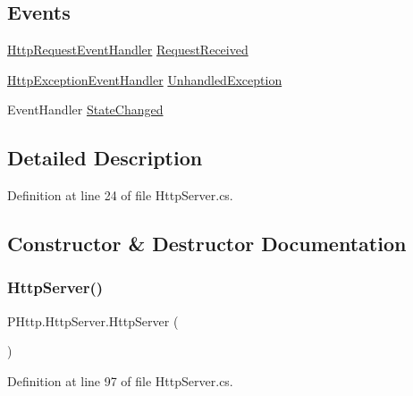 \subsection*{Events}
\begin{DoxyCompactItemize}
\item 
\hyperlink{namespace_p_http_a746b16e27637dd7ea95bb9256e7a93ff}{Http\+Request\+Event\+Handler} \hyperlink{class_p_http_1_1_http_server_ad29016597c3dd5c2aa944afce3c7dd13}{Request\+Received}
\item 
\hyperlink{namespace_p_http_a3004f4a8bbd5aaf98c00d1771384224f}{Http\+Exception\+Event\+Handler} \hyperlink{class_p_http_1_1_http_server_a08a7e838dc1d9c70ffa94ffce48a4533}{Unhandled\+Exception}
\item 
Event\+Handler \hyperlink{class_p_http_1_1_http_server_a2a33f616b3d6fc6df79ec3c23f562a4b}{State\+Changed}
\end{DoxyCompactItemize}


\subsection{Detailed Description}


Definition at line 24 of file Http\+Server.\+cs.



\subsection{Constructor \& Destructor Documentation}
\mbox{\label{class_p_http_1_1_http_server_a6eda60a2a05fb5850dec16bbc620fb99}} 
\subsubsection{\texorpdfstring{Http\+Server()}{HttpServer()}\hspace{0.1cm}{\footnotesize\ttfamily [1/4]}}
{\footnotesize\ttfamily P\+Http.\+Http\+Server.\+Http\+Server (\begin{DoxyParamCaption}{ }\end{DoxyParamCaption})}



Definition at line 97 of file Http\+Server.\+cs.

\mbox{\label{class_p_http_1_1_http_server_a50be37686732622c81f34cbe5a7a73e7}} 
